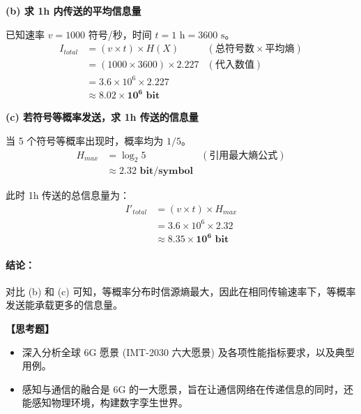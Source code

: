 \documentclass[a4paper,11pt]{ctexart}
\begin{document}
\begin{enumerate}[label=\textbf{1-\arabic*}]
    \textbf{(b) 求 1h 内传送的平均信息量}
    
    已知速率 $v = 1000$ 符号/秒，时间 $t = 1 \text{ h} = 3600 \text{ s}$。
    \begin{align*}
        I_{total} &= (v \times t) \times H(X) & (\text{总符号数} \times \text{平均熵}) \\
                  &= (1000 \times 3600) \times 2.227 & (\text{代入数值}) \\
                  &= 3.6 \times 10^6 \times 2.227 \\
                  &\approx \mathbf{8.02 \times 10^6 \text{ bit}}
    \end{align*}
    
    \textbf{(c) 若符号等概率发送，求 1h 传送的信息量}
    
    当 5 个符号等概率出现时，概率均为 $1/5$。
    \begin{align*}
        H_{max} &= \log_2 5 & (\text{引用最大熵公式}) \\
                &\approx \mathbf{2.32 \text{ bit/symbol}}
    \end{align*}
    
    此时 1h 传送的总信息量为：
    \begin{align*}
        I'_{total} &= (v \times t) \times H_{max} \\
                   &= 3.6 \times 10^6 \times 2.32 \\
                   &\approx \mathbf{8.35 \times 10^6 \text{ bit}}
    \end{align*}

    \paragraph{结论：}
    对比 (b) 和 (c) 可知，等概率分布时信源熵最大，因此在相同传输速率下，等概率发送能承载更多的信息量。


\end{enumerate}

\noindent\textbf{【思考题】}
\begin{itemize}
    \item[1.] 深入分析全球 6G 愿景 (IMT-2030 六大愿景) 及各项性能指标要求，以及典型用例。
    \item[2.] 感知与通信的融合是 6G 的一大愿景，旨在让通信网络在传递信息的同时，还能感知物理环境，构建数字孪生世界。
\end{itemize}
\end{document}
